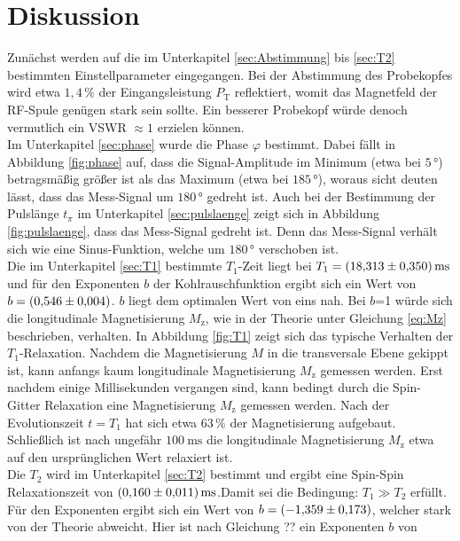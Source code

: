 \section{Diskussion}
\label{sec:Diskussion}
Zunächst werden auf die im Unterkapitel \ref{sec:Abstimmung} bis \ref{sec:T2}
bestimmten Einstellparameter eingegangen.
Bei der Abstimmung des Probekopfes wird etwa $1,4\,\%$ der Eingangsleistung
$P_{\text{T}}$ reflektiert, womit das Magnetfeld der RF-Spule genügen stark sein
sollte. Ein besserer Probekopf würde denoch vermutlich ein VSWR $\approx1$ erzielen
können.\\
Im Unterkapitel \ref{sec:phase} wurde die Phase $\varphi$ bestimmt. Dabei fällt
in Abbildung \ref{fig:phase} auf, dass die Signal-Amplitude im Minimum (etwa bei $5\,°$)
betragsmäßig größer ist als das Maximum (etwa bei $185\,°$), woraus sicht deuten
lässt, dass das Mess-Signal um $180\,°$ gedreht ist.
Auch bei der Bestimmung der Pulslänge $t_{\pi}$ im Unterkapitel \ref{sec:pulslaenge}
zeigt sich in Abbildung \ref{fig:pulslaenge}, dass das Mess-Signal gedreht ist.
Denn das Mess-Signal verhält sich wie eine Sinus-Funktion, welche um $180\,°$
verschoben ist.\\
Die im Unterkapitel \ref{sec:T1} bestimmte $T_1$-Zeit liegt bei
$T_1 = \SI{18.313\pm0.350}{\milli\second}$ und für den Exponenten $b$ der
Kohlrauschfunktion ergibt sich ein Wert von $b = \SI{0,546\pm0,004}{}$. $b$ liegt
dem optimalen Wert von eins nah. Bei $b$=1 würde sich die longitudinale
Magnetisierung $M_{\text{z}}$, wie in der Theorie unter Gleichung \ref{eq:Mz}
beschrieben, verhalten. In Abbildung \ref{fig:T1} zeigt sich das typische Verhalten
der $T_1$-Relaxation. Nachdem die Magnetisierung $M$ in die transversale Ebene gekippt ist,
kann anfangs kaum longitudinale Magnetisierung $M_{\text{z}}$ gemessen werden.
Erst nachdem einige Millisekunden vergangen sind, kann bedingt durch die Spin-Gitter
Relaxation eine Magnetisierung $M_{\text{z}}$ gemessen werden. Nach der Evolutionszeit
$t=T_1$ hat sich etwa $63\,\%$ der Magnetisierung aufgebaut. Schließlich ist nach
ungefähr $\SI{100}{\milli\second}$ die longitudinale Magnetisierung $M_{\text{z}}$
etwa auf den ursprünglichen Wert relaxiert ist.\\
Die $T_2$ wird im Unterkapitel \ref{sec:T2} bestimmt und ergibt eine Spin-Spin
Relaxationszeit von $\SI{0.160\pm0.011}{\milli\second}$.Damit sei die Bedingung:
$T_1 \gg T_2$ erfüllt.
Für den Exponenten ergibt sich ein Wert von $b = \SI{-1,359\pm0,173}{}$, welcher
stark von der Theorie abweicht. Hier ist nach Gleichung ?? ein Exponenten $b$ von
